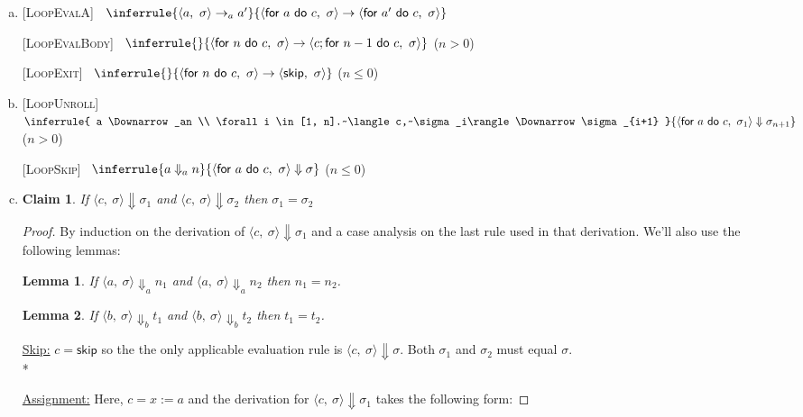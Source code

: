 \documentclass[10pt]{article}
\newcommand{\stepsA}{\rightarrow_a}
\newcommand{\steps}{\rightarrow}
\newcommand{\for}[2]{\textsf{for}~#1~\textsf{do}~#2}
\newcommand{\config}[2]{\langle#1,~#2\rangle}
\newcommand{\impSkip}{\textsf{skip}}
\newcommand{\bigStepsA}{\Downarrow_a}
\newcommand{\bigStepsB}{\Downarrow_b}
\newcommand{\bigSteps}{\Downarrow}
\newcommand{\Rule}[3]{
  [\textsc{#1}]~
  \label{rule:#1}
  \hfill
  \ensuremath{\inferrule{#2}{#3}}
  \hfill
}
\newcommand{\RuleWithCondition}[4]{
  [\textsc{#1}]~
  \label{rule:#1}
  \hfill
  \ensuremath{\inferrule{#2}{#3}}
  (#4)
  \hfill
}
\newtheorem{claim}{Claim}[section]
\newtheorem{lemma}{Lemma}[claim]
\begin{document}
\begin{enumerate}[(a)]
  \item
  \Rule{LoopEvalA}{
    \config{a}{\sigma} \stepsA a'
  }{
    \config{\for{a}{c}}{\sigma} \steps \config{\for{a'}{c}}{\sigma}
  }

  \RuleWithCondition{LoopEvalBody}{}{
    \config{\for n c}{\sigma} \steps \config{c; \for{n - 1}{c}}{\sigma}
  }{$n > 0$}
  \RuleWithCondition{LoopExit}{}{
    \config{\for n c}{\sigma} \steps \config{\impSkip}{\sigma}
  }{$n \leq 0$}

  \item
  \RuleWithCondition{LoopUnroll}{
    a \bigStepsA n \\
    \forall i \in [1, n].~\config{c}{\sigma_i} \bigSteps \sigma_{i+1}
  }{
    \config{\for a c}{\sigma_1} \bigSteps \sigma_{n+1}
  }{$n > 0$}

  \RuleWithCondition{LoopSkip}{
    a \bigStepsA n
  }{
    \config{\for a c}{\sigma} \bigSteps \sigma
  }{$n \leq 0$}

  \item
  \begin{claim}
    If   $\config{c}{\sigma} \bigSteps \sigma_1$
    and  $\config{c}{\sigma} \bigSteps \sigma_2$
    then $\sigma_1 = \sigma_2$
  \end{claim}

  \begin{proof} By induction on the derivation of $\config{c}{\sigma} \bigSteps
    \sigma_1$ and a case analysis on the last rule used in that derivation.
    We'll also use the following lemmas:

    \begin{lemma} \label{evalA}
      If   $\config{a}{\sigma} \bigStepsA n_1$
      and  $\config{a}{\sigma} \bigStepsA n_2$
      then $n_1 = n_2$.
    \end{lemma}

    \begin{lemma} \label{evalB}
      If   $\config{b}{\sigma} \bigStepsB t_1$
      and  $\config{b}{\sigma} \bigStepsB t_2$
      then $t_1 = t_2$.
    \end{lemma}

    \underline{Skip:} $c = \impSkip$ so the the only applicable evaluation rule
    is $\config{c}{\sigma} \bigSteps \sigma$. Both $\sigma_1$ and $\sigma_2$
    must equal $\sigma$. \\*

    \underline{Assignment:}
    Here, $c = x := a$ and the derivation for $\config{c}{\sigma} \bigSteps
    \sigma_1$ takes the following form:


\end{proof}
\end{enumerate}
\end{document}
